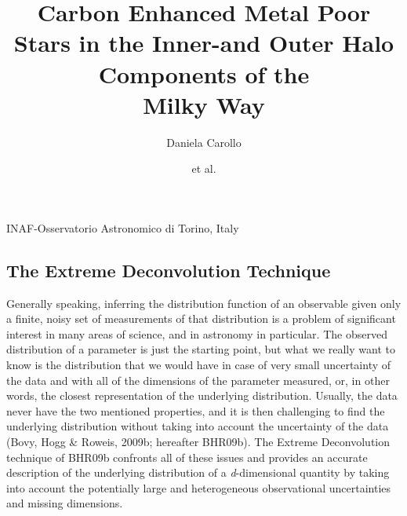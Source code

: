\documentclass[apj]{emulateapj}
\begin{document}

\title{Carbon Enhanced Metal Poor Stars in the Inner-and Outer Halo Components of the\\ Milky Way}


\author{Daniela Carollo}

\author{et al.}


 {INAF-Osservatorio Astronomico di Torino, Italy}

\begin{abstract}

\end{abstract}


\subsection{The Extreme Deconvolution Technique}

Generally speaking, inferring the distribution function of an
observable given only a finite, noisy set of measurements of that
distribution is a problem of significant interest in many areas of
science, and in astronomy in particular. The observed distribution of
a parameter is just the starting point, but what we really want to
know is the distribution that we would have in case of very small
uncertainty of the data and with all of the dimensions of the
parameter measured, or, in other words, the closest representation of
the underlying distribution. Usually, the data never have the two
mentioned properties, and it is then challenging to find the
underlying distribution without taking into account the uncertainty of
the data (Bovy, Hogg \& Roweis, 2009b; hereafter BHR09b). The Extreme
Deconvolution technique of BHR09b confronts all of these issues and
provides an accurate description of the underlying distribution of a
\emph{d}-dimensional quantity by taking into account the potentially
large and heterogeneous observational uncertainties and missing
dimensions.
\end{document}
